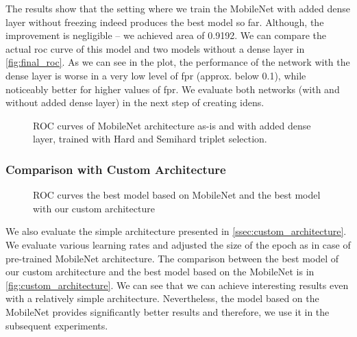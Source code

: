 The results show that the setting where we train the MobileNet with added dense layer without freezing indeed produces the best model so far. Although, the improvement is negligible -- we achieved area of 0.9192. We can compare the actual \gls{roc} curve of this model and two models without a dense layer in \autoref{fig:final_roc}. As we can see in the plot, the performance of the network with the dense layer is worse in a very low level of \gls{fpr} (approx. below 0.1), while noticeably better for higher values of \gls{fpr}. We evaluate both networks (with and without added dense layer) in the next step of creating \glspl{iden}.


\begin{figure}
    \centering
    \def\svgwidth{\columnwidth}
    
    \caption[ROC curves of MobileNet architecture with various alterations]{ROC curves of MobileNet architecture as-is and with added dense layer, trained with Hard and Semihard triplet selection.}
    \label{fig:final_roc}
\end{figure}


\subsubsection{Comparison with Custom Architecture}

\begin{figure}
    \centering
    \def\svgwidth{\columnwidth}
    
    \caption{ROC curves the best model based on MobileNet and the best model with our custom architecture}
    \label{fig:custom_architecture}
\end{figure}

We also evaluate the simple architecture presented in \autoref{ssec:custom_architecture}. We evaluate various learning rates and adjusted the size of the epoch as in case of pre-trained MobileNet architecture. The comparison between the best model of our custom architecture and the best model based on the MobileNet is in \autoref{fig:custom_architecture}. We can see that we can achieve interesting results even with a relatively simple architecture. Nevertheless, the model based on the MobileNet provides significantly better results and therefore, we use it in the subsequent experiments.

